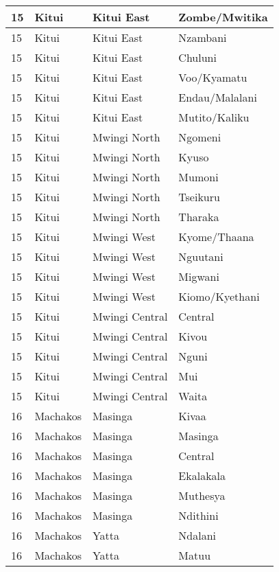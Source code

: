 \begin{table}[!ht]
\begin{tabular}{|l|l|l|l|}
        15 & Kitui & Kitui East & Zombe/Mwitika \\ \hline
        15 & Kitui & Kitui East & Nzambani \\ \hline
        15 & Kitui & Kitui East & Chuluni \\ \hline
        15 & Kitui & Kitui East & Voo/Kyamatu \\ \hline
        15 & Kitui & Kitui East & Endau/Malalani \\ \hline
        15 & Kitui & Kitui East & Mutito/Kaliku \\ \hline
        15 & Kitui & Mwingi North & Ngomeni \\ \hline
        15 & Kitui & Mwingi North & Kyuso \\ \hline
        15 & Kitui & Mwingi North & Mumoni \\ \hline
        15 & Kitui & Mwingi North & Tseikuru \\ \hline
        15 & Kitui & Mwingi North & Tharaka \\ \hline
        15 & Kitui & Mwingi West & Kyome/Thaana \\ \hline
        15 & Kitui & Mwingi West & Nguutani \\ \hline
        15 & Kitui & Mwingi West & Migwani \\ \hline
        15 & Kitui & Mwingi West & Kiomo/Kyethani \\ \hline
        15 & Kitui & Mwingi Central & Central \\ \hline
        15 & Kitui & Mwingi Central & Kivou \\ \hline
        15 & Kitui & Mwingi Central & Nguni \\ \hline
        15 & Kitui & Mwingi Central & Mui \\ \hline
        15 & Kitui & Mwingi Central & Waita \\ \hline
        16 & Machakos & Masinga & Kivaa \\ \hline
        16 & Machakos & Masinga & Masinga \\ \hline
        16 & Machakos & Masinga & Central \\ \hline
        16 & Machakos & Masinga & Ekalakala \\ \hline
        16 & Machakos & Masinga & Muthesya \\ \hline
        16 & Machakos & Masinga & Ndithini \\ \hline
        16 & Machakos & Yatta & Ndalani \\ \hline
        16 & Machakos & Yatta & Matuu \\ \hline

\end{tabular}
\end{table}
